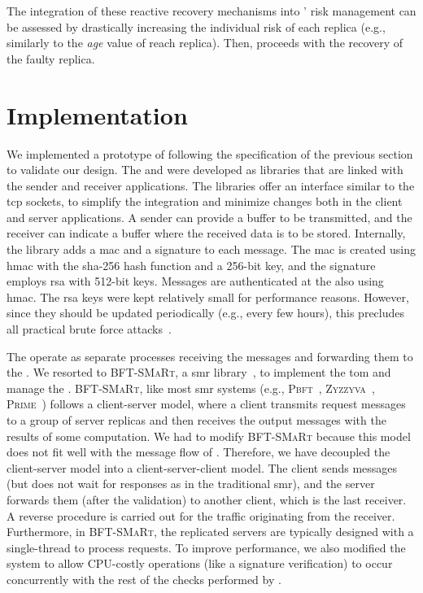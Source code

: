 The integration of these reactive recovery mechanisms into \system' risk management can be assessed by drastically increasing the individual risk of each replica (e.g., similarly to the \emph{age} value of reach replica). 
Then, \system proceeds with the recovery of the faulty replica.


\section{Implementation}
\label{implementation}


We implemented a prototype of \sieveq following the specification of the previous section to validate our design.
The \sender and \postsieve were developed as libraries that are linked with the sender and receiver applications. 
The libraries offer an interface similar to the \gls{tcp} sockets, to simplify the integration and minimize changes both in the client and server applications. 
A sender can provide a buffer to be transmitted, and the receiver can indicate a buffer where the received data is to be stored.
Internally, the \sender library adds a \gls{mac} and a signature to each message. 
The \gls{mac} is created using \gls{hmac} with the \gls{sha}-256 hash function and a 256-bit key, and the signature employs \gls{rsa} with 512-bit keys. 
Messages are authenticated at the \postsieve also using \gls{hmac}. 
The \gls{rsa} keys were kept relatively small for performance reasons. 
However, since they should be updated periodically (e.g., every few hours), this precludes all practical brute force attacks~\cite{David:2015}.%

The \presieves operate as separate processes receiving the messages and forwarding them to the \repsieves.
We resorted to \textsc{BFT-SMaRt}, a \gls{smr} library~\cite{Bessani:2014}, to implement the \gls{tom} and manage the \repsieves.
\textsc{BFT-SMaRt}, like most \gls{smr} systems (e.g., \textsc{Pbft}~\cite{Castro:2002}, \textsc{Zyzzyva}~\cite{Kotla:2010}, \textsc{Prime}~\cite{Amir:2011}) follows a client-server model, where a client transmits request messages to a group of server replicas and then receives the output messages with the results of some computation.
We had to modify \textsc{BFT-SMaRt} because this model does not fit well with the message flow of \sieveq.
Therefore, we have decoupled the client-server model into a client-server-client model.
The client sends messages (but does not wait for responses as in the traditional \gls{smr}), and the server forwards them (after the validation) to another client, which is the last receiver.
A reverse procedure is carried out for the traffic originating from the receiver.
Furthermore, in \textsc{BFT-SMaRt}, the replicated servers are typically designed with a single-thread to process requests.
To improve performance, we also modified the system to allow CPU-costly operations (like a signature verification) to occur concurrently with the rest of the checks performed by \repsieves.

